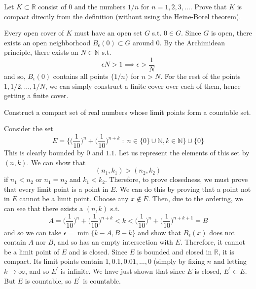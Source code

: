   \begin{exercise}[Rudin 2.12]
    Let $K \subset \mathbb{R}$ consist of $0$ and the numbers $1/n$ for $n = 1, 2, 3, \ldots$. Prove that $K$ is compact directly from the definition (without using the Heine-Borel theorem). 
  \end{exercise}
  \begin{solution}
    Every open cover of $K$ must have an open set $G$ s.t. $0 \in G$. Since $G$ is open, there exists an open neighborhood $B_\epsilon (0) \subset G$ around $0$. By the Archimidean principle, there exists an $N \in \mathbb{N}$ s.t. 
    \begin{equation}
      \epsilon N > 1 \implies \epsilon > \frac{1}{N}
    \end{equation}
    and so, $B_\epsilon (0)$ contains all points $\{1/n\}$ for $n > N$. For the rest of the points $1, 1/2, \ldots, 1/N$, we can simply construct a finite cover over each of them, hence getting a finite cover. 
  \end{solution}

  \begin{exercise}[Rudin 2.13]
    Construct a compact set of real numbers whose limit points form a countable set. 
  \end{exercise}
  \begin{solution}
    Consider the set 
    \begin{equation}
      E = \bigg\{ \bigg( \frac{1}{10}\bigg)^n + \bigg( \frac{1}{10} \bigg)^{n+k} \; : \; n \in \{0\} \cup \mathbb{N}, k \in \mathbb{N} \bigg\} \cup \{0\}
    \end{equation}
    This is clearly bounded by $0$ and $1.1$. Let us represent the elements of this set by $(n, k)$. We can show that 
    \begin{equation}
      (n_1, k_1) > (n_2, k_2)
    \end{equation}
    if $n_1 < n_2$ or $n_1 = n_2$ and $k_1 < k_2$. Therefore, to prove closedness, we must prove that every limit point is a point in $E$. We can do this by proving that a point not in $E$ cannot be a limit point. Choose any $x \not\in E$. Then, due to the ordering, we can see that there exists a $(n, k)$ s.t. 
    \begin{equation}
      A = \bigg( \frac{1}{10}\bigg)^n + \bigg( \frac{1}{10} \bigg)^{n+k} < k < \bigg( \frac{1}{10}\bigg)^n + \bigg( \frac{1}{10} \bigg)^{n+k+1} = B
    \end{equation}
    and so we can take $\epsilon = \min\{k - A, B - k\}$ and show that $B_\epsilon (x)$ does not contain $A$ nor $B$, and so has an empty intersection with $E$. Therefore, it cannot be a limit point of $E$ and is closed. Since $E$ is bounded and closed in $\mathbb{R}$, it is compact. Its limit points contain $1, 0.1, 0.01, \ldots, 0$ (simply by fixing $n$ and letting $k \rightarrow \infty$, and so $E^\prime$ is infinite. We have just shown that since $E$ is closed, $E^\prime \subset E$. But $E$ is countable, so $E^\prime$ is countable. 
  \end{solution}

